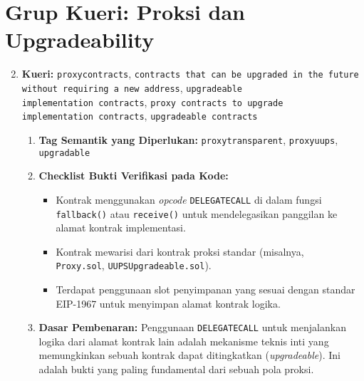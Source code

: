 \section{Grup Kueri: Proksi dan Upgradeability}
\begin{enumerate}
	\setcounter{enumi}{1}
	\item \textbf{Kueri:} \texttt{proxy\textunderscore contracts}, \texttt{contracts that can be upgraded in the future without requiring a new address}, \texttt{upgradeable \\implementation contracts}, \texttt{proxy contracts to upgrade \\implementation contracts}, \texttt{upgradeable contracts}
	      \begin{enumerate}
		      \item \textbf{Tag Semantik yang Diperlukan:} \texttt{proxy\textunderscore transparent}, \texttt{proxy\textunderscore uups}, \texttt{upgradable}
		      \item \textbf{Checklist Bukti Verifikasi pada Kode:}
		            \begin{itemize}
			            \item Kontrak menggunakan \textit{opcode} \texttt{DELEGATECALL} di dalam fungsi \texttt{fallback()} atau \texttt{receive()} untuk mendelegasikan panggilan ke alamat kontrak implementasi.
			            \item Kontrak mewarisi dari kontrak proksi standar (misalnya, \\\texttt{Proxy.sol}, \texttt{UUPSUpgradeable.sol}).
			            \item Terdapat penggunaan slot penyimpanan yang sesuai dengan standar EIP-1967 untuk menyimpan alamat kontrak logika.
		            \end{itemize}
		      \item \textbf{Dasar Pembenaran:} Penggunaan \texttt{DELEGATECALL} untuk menjalankan logika dari alamat kontrak lain adalah mekanisme teknis inti yang memungkinkan sebuah kontrak dapat ditingkatkan (\textit{upgradeable}). Ini adalah bukti yang paling fundamental dari sebuah pola proksi.
	      \end{enumerate}
\end{enumerate}

